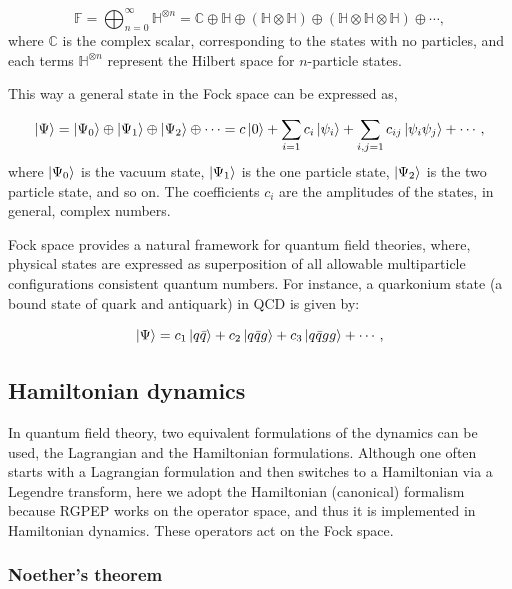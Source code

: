 \documentclass[11pt,a4paper,twoside,pdf]{article}
\numberwithin{equation}{section}
\begin{document}
\begin{equation}
    \mathbb{F} = \bigoplus_{n=0}^{\infty}  \mathbb{H}^{\otimes n} = 
    \mathbb{C} \oplus \mathbb{H} \oplus (\mathbb{H} \otimes \mathbb{H}) 
    \oplus (\mathbb{H} \otimes \mathbb{H}\otimes \mathbb{H}) \oplus \cdots,
\end{equation}
where $\mathbb{C}$ is the complex scalar, corresponding to the states with no particles,
and each terms \( \mathbb{H}^{\otimes n} \) represent the Hilbert space for 
\( n \)-particle states.

This way a general state in the Fock space can be expressed as,

\begin{equation}
    \ket{\Psi} = \ket{\Psi_0} \oplus \ket{\Psi_1} \oplus
    \ket{\Psi_2} \oplus \cdots = c \ket{0} + \sum_{i=1}c_i \ket{\psi_i} +
    \sum_{i,j=1}c_{ij} \ket{\psi_i \psi_j} + \cdots,
\end{equation}
where $\ket{\Psi_0}$ is the vacuum state, $\ket{\Psi_1}$ is the one particle
state, $\ket{\Psi_2}$ is the two particle state, and so on. The coefficients $c_i$
are the amplitudes of the states, in general, complex numbers. 

Fock space provides a natural framework for quantum field theories, where, 
physical states are expressed as superposition of all allowable multiparticle 
configurations consistent quantum numbers. 
For instance, a quarkonium state (a bound state of quark and antiquark) in QCD is 
given by:

\begin{equation}
    \ket{\Psi} = c_1 \ket{q\bar{q}} + c_2 \ket{q\bar{q}g} + c_3 \ket{q\bar{q}gg} + \cdots,
\end{equation}

\subsection{Hamiltonian dynamics}

In quantum field theory, two equivalent formulations of the dynamics can be used, 
the Lagrangian and the Hamiltonian formulations. Although one often starts with a 
Lagrangian formulation and then switches to a Hamiltonian via a Legendre transform, 
here we adopt the Hamiltonian (canonical) formalism because RGPEP works on the operator
space, and thus it is implemented in Hamiltonian dynamics. These operators act 
on the Fock space.

\subsubsection{Noether's theorem}
\end{document}
